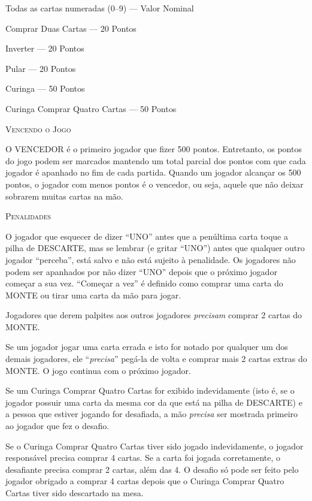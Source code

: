 Todas as cartas numeradas (0--9) --- Valor Nominal

Comprar Duas Cartas --- 20 Pontos

Inverter --- 20 Pontos

Pular --- 20 Pontos

Curinga --- 50 Pontos

Curinga Comprar Quatro Cartas --- 50 Pontos

\vspace{0.5cm}

\textsc{\large{Vencendo o Jogo}}

O VENCEDOR é o primeiro jogador que fizer 500 pontos. Entretanto, os pontos do jogo podem ser marcados mantendo um total parcial dos pontos com que cada jogador é apanhado no fim de cada partida. Quando um jogador alcançar os 500 pontos, o jogador com menos pontos é o vencedor, ou seja, aquele que não deixar sobrarem muitas cartas na mão.

\vspace{0.5cm}

\textsc{\large{Penalidades}}

O jogador que esquecer de dizer ``UNO'' antes que a penúltima carta toque a pilha de DESCARTE, mas se lembrar (e gritar ``UNO'') antes que qualquer outro jogador ``perceba'', está salvo e não está sujeito à penalidade. Os jogadores não podem ser apanhados por não dizer ``UNO'' depois que o próximo jogador começar a sua vez. ``Começar a vez'' é definido como comprar uma carta do MONTE ou tirar uma carta da mão para jogar.

Jogadores que derem palpites aos outros jogadores \textit{precisam} comprar 2 cartas do MONTE.

Se um jogador jogar uma carta errada e isto for notado por qualquer um dos demais jogadores, ele ``\textit{precisa}'' pegá-la de volta e comprar mais 2 cartas extras do MONTE. O jogo continua com o próximo jogador.

Se um Curinga Comprar Quatro Cartas for exibido indevidamente (isto é, se o jogador possuir uma carta da mesma cor da que está na pilha de DESCARTE) e a pessoa que estiver jogando for desafiada, a mão \textit{precisa} ser mostrada primeiro ao jogador que fez o desafio.

Se o Curinga Comprar Quatro Cartas tiver sido jogado indevidamente, o jogador responsável precisa comprar 4 cartas. Se a carta foi jogada corretamente, o desafiante precisa comprar 2 cartas, além das 4. O desafio só pode ser feito pelo jogador obrigado a comprar 4 cartas depois que o Curinga Comprar Quatro Cartas tiver sido descartado na mesa.

